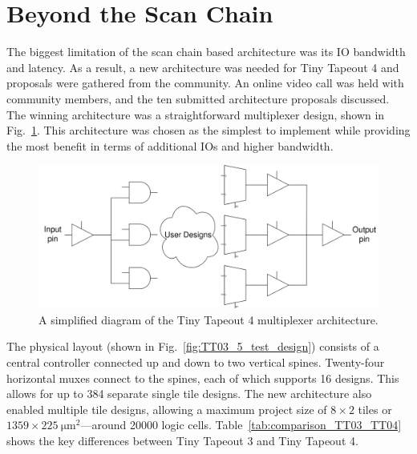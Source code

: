 \section{Beyond the Scan Chain}
\label{sec:beyond_scanchain}
The biggest limitation of the scan chain based architecture was its IO bandwidth and latency.
As a result, a new architecture was needed for Tiny Tapeout 4 and proposals were gathered from the community.
An online video call was held with community members, and the ten submitted architecture proposals discussed.
The winning architecture was a straightforward multiplexer design, shown in Fig.~\ref{fig:multiplexer_design}. This architecture was chosen as the simplest to implement while providing the most benefit in terms of additional IOs and higher bandwidth.

\begin{figure}[!t]
\centering
\includegraphics[width=\columnwidth]{./Figs/mux architecture.png}
\caption{A simplified diagram of the Tiny Tapeout 4 multiplexer architecture.}
\label{fig:multiplexer_design}
\end{figure}

The physical layout (shown in Fig.~\ref{fig:TT03_5_test_design}) consists of a central controller connected up and down to two vertical spines.
Twenty-four horizontal muxes connect to the spines, each of which supports 16 designs.
This allows for up to 384 separate single tile designs.
The new architecture also enabled multiple tile designs, allowing a maximum project size of $8 \times 2$ tiles or $1359 \times \qty{225}{\um\squared}$---around \num{20000} logic cells. Table~\ref{tab:comparison_TT03_TT04} shows the key differences between Tiny Tapeout 3 and Tiny Tapeout 4.

